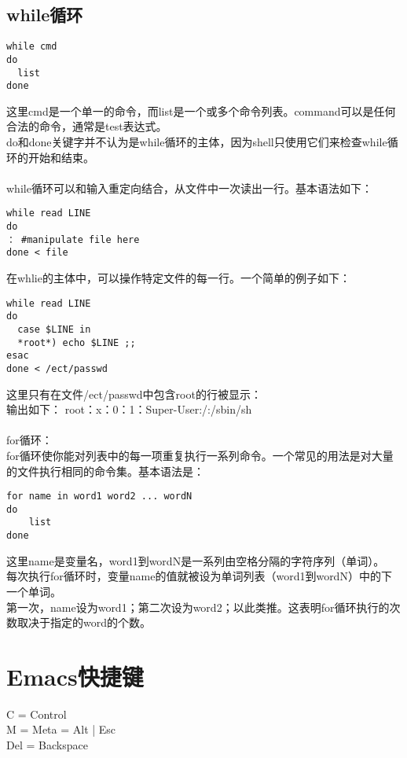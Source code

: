 \documentclass[11pt,a4paper,titlepage]{article}
\begin{document}
{\subsection{\kai while循环}
\begin{lstlisting}
while cmd
do
  list
done
\end{lstlisting}
这里cmd是一个单一的命令，而list是一个或多个命令列表。command可以是任何合法的命令，通常是test表达式。\\
do和done关键字并不认为是while循环的主体，因为shell只使用它们来检查while循环的开始和结束。\\
\\
while循环可以和输入重定向结合，从文件中一次读出一行。基本语法如下：
\begin{lstlisting}
while read LINE
do
： #manipulate file here
done < file
\end{lstlisting}
在whlie的主体中，可以操作特定文件的每一行。一个简单的例子如下：
\begin{lstlisting}
while read LINE
do
  case $LINE in
  *root*) echo $LINE ;;
esac
done < /ect/passwd
\end{lstlisting}
这里只有在文件/ect/passwd中包含root的行被显示：\\
输出如下：  root：x：0：1：Super-User:/:/sbin/sh\\
\\
for循环：\\
for循环使你能对列表中的每一项重复执行一系列命令。一个常见的用法是对大量的文件执行相同的命令集。基本语法是：
\begin{lstlisting}
for name in word1 word2 ... wordN
do
    list
done
\end{lstlisting}
这里name是变量名，word1到wordN是一系列由空格分隔的字符序列（单词）。\\
每次执行for循环时，变量name的值就被设为单词列表（word1到wordN）中的下一个单词。\\
第一次，name设为word1；第二次设为word2；以此类推。这表明for循环执行的次数取决于指定的word的个数。\\

\section{\kai Emacs快捷键}
C = Control\\
M = Meta = Alt | Esc\\
Del = Backspace\\
}
\end{document}
